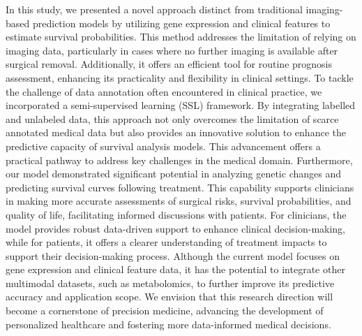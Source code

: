 \documentclass[conference]{ieeeconf}
\begin{document}
In this study, we presented a novel approach distinct from traditional imaging-based prediction models by utilizing gene expression and clinical features to estimate survival probabilities. This method addresses the limitation of relying on imaging data, particularly in cases where no further imaging is available after surgical removal. Additionally, it offers an efficient tool for routine prognosis assessment, enhancing its practicality and flexibility in clinical settings.
To tackle the challenge of data annotation often encountered in clinical practice, we incorporated a semi-supervised learning (SSL) framework. By integrating labelled and unlabeled data, this approach not only overcomes the limitation of scarce annotated medical data but also provides an innovative solution to enhance the predictive capacity of survival analysis models. This advancement offers a practical pathway to address key challenges in the medical domain.
Furthermore, our model demonstrated significant potential in analyzing genetic changes and predicting survival curves following treatment. This capability supports clinicians in making more accurate assessments of surgical risks, survival probabilities, and quality of life, facilitating informed discussions with patients. For clinicians, the model provides robust data-driven support to enhance clinical decision-making, while for patients, it offers a clearer understanding of treatment impacts to support their decision-making process.
Although the current model focuses on gene expression and clinical feature data, it has the potential to integrate other multimodal datasets, such as metabolomics, to further improve its predictive accuracy and application scope. We envision that this research direction will become a cornerstone of precision medicine, advancing the development of personalized healthcare and fostering more data-informed medical decisions.


\addtolength{\textheight}{-12cm}   %












\end{document}
